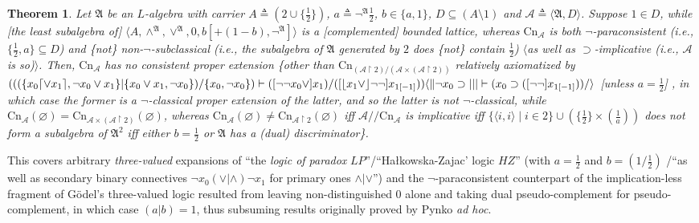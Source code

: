 \documentclass[bsl,meeting]{asl}
\newcommand{\mf}[1]{\mathfrak{#1}}
\newcommand{\mc}[1]{\mathcal{#1}}
\newcommand{\mbf}[1]{\mathbf{#1}}
\newcommand{\couple}[2]{\langle{#1},{#2}\rangle}
\newcommand{\restr}{{\upharpoonright}}
\newtheorem{theorem}{Theorem}
\def\e{{\frac{1}{2}} }
\newcommand{\Cn}{\mathrm{Cn}}
\begin{document}
\begin{theorem}
\label{main-thm}
Let\/ $\mf{A}$ be an $L$-algebra with carrier
$A\triangleq(2\cup\{\e\})$,
$a\triangleq\neg^{\mf{A}}\e$,
$b\in\{a,1\}$,
$D\subseteq(A\setminus1)$
and
$\mc{A}\triangleq\couple{\mf{A}}{D}$.
Suppose\/ $1\in D$,
while\/ [the least subalgebra of]\/ %
$\couple{A}{\land^{\mf{A}},\lor^{\mf{A}},0,b[+(1-b),\neg^{\mf{A}}]}$
is a [complemented] bounded lattice, %
whereas\/ $\Cn_{\mc{A}}$ is both\/
$\neg$-paraconsistent (i.e., $\{\e,a\}\subseteq D$)
and\/ \{not\/\}
non-$\neg$-subclassical (i.e.,
the subalgebra of\/ $\mf{A}$ generated by\/ $2$
does\/ \{not\/\} contain\/ $\e$)
$\langle$as well as\/
$\supset$-implicative
(i.e., $\mc{A}$ is so)\/$\rangle$.
Then, $\Cn_{\mc{A}}$ has no consistent proper extension\/
\{other than\/
$\Cn_{(\mc{A}\restr2)/(\mc{A}\times(\mc{A}\restr2))}$
relatively axiomatized by\/
$(((\{x_0\lceil\lor x_1\rceil,\neg x_0\lor x_1\}|\{x_0\lor x_1,\neg x_0\})/\{x_0,\neg x_0\})\vdash([\neg\neg x_0\lor] x_1)/([\lfloor x_1\lor\rfloor\neg\neg]\linebreak x_{1[-1]}))\langle\|
\neg x_0\supset|||\vdash(x_0\supset([\neg\neg] x_{1[-1]}))/\rangle$
[unless $a=\e$]
, %
in which case
the former is a\/ $\neg$-classical proper extension of the latter,
and so the latter is not\/ $\neg$-classical,
while\/ $\Cn_{\mc{A}}(\varnothing)=
\Cn_{\mc{A}\times(\mc{A}\restr2)}(\varnothing)$,
whereas\/ $\Cn_{\mc{A}}(\varnothing)\neq
\Cn_{\mc{A}\restr2}(\varnothing)$ iff
$\mc{A}/\!/\Cn_{\mc{A}}$ is implicative
iff\/
$\{\couple{i}{i}\mid i\in2\}\cup(\{\e\}\times(\frac{1}{a}))$
does not form a subalgebra of\/ $\mf{A}^2$
iff  either\/ $b=\e$
or\/ $\mf{A}$ has a (dual)
discriminator\/\}.
\end{theorem}

This covers arbitrary {\em three-valued\/} expansions of
``the {\em logic of paradox} $LP$''/``Ha\l{}kow\-s\-ka-Zajac' logic
$HZ$'' (with $a=\e$ and $b=(1/\e)$
/``as well as secondary binary connectives $\neg x_0(\lor|\land)\neg x_1$
for primary ones $\land|\lor$'') and %
the $\neg$-paraconsistent counterpart of %
the implication-less fragment of G\"{o}del's
three-valued logic %
resulted from leaving non-distinguished $0$ alone and
taking dual pseudo-complement
for pseudo-complement, %
in which case $(a|b)=1$, %
thus subsuming results originally proved by {\sc Pynko} {\em ad hoc}.
\end{document}

